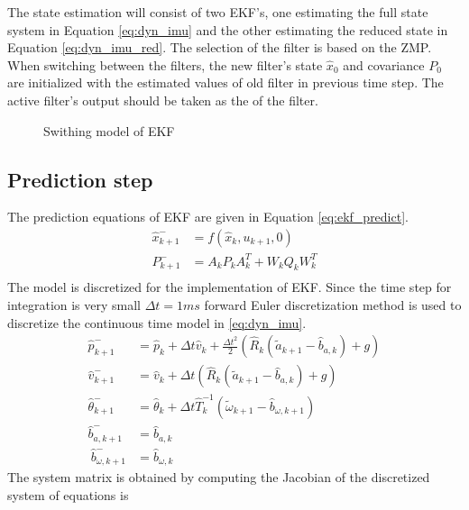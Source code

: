 The state estimation will consist of two EKF's, one estimating the full state system in Equation \ref{eq:dyn_imu} and the other estimating the reduced state in Equation \ref{eq:dyn_imu_red}. The selection of the filter is based on the ZMP. When switching between the filters, the new filter's state $\hat{x}_0$ and covariance $P_0$ are initialized with the estimated values of old filter in previous time step. The active filter's output should be taken as the of the filter.

\begin{figure}
	\centering
	
	\caption{Swithing model of EKF}
	\label{fig:ekf_switch}
\end{figure}

\subsection{Prediction step}
The prediction equations of EKF are given in Equation \ref{eq:ekf_predict}. 
\begin{equation}
\label{eq:imu_predict}
\begin{split}
\hat{x}_{k+1}^- &= f(\hat{x}_{k},u_{k+1},0)\\
P_{k+1}^- &= A_kP_{k}A_k^T + W_kQ_{k}W_k^T\\
\end{split}
\end{equation}
The model is discretized for the implementation of EKF. Since the time step for integration is very small $\Delta t = 1ms$ forward Euler discretization method is used to discretize the continuous time model in \ref{eq:dyn_imu}.
\begin{equation}
    \label{eq:dyn_imu_disc}
    \begin{split}
    \hat{p}_{k+1}^- &= \hat{p}_k + \Delta t \hat{v}_k + \frac{\Delta t^2}{2} (\hat{R}_k (\tilde{a}_{k+1} - \hat{b}_{a,k})+g) \\
    \hat{v}_{k+1}^- &= \hat{v}_k + \Delta t (\hat{R}_k (\tilde{a}_{k+1} - \hat{b}_{a,k})+g) \\
    \hat{\theta}_{k+1}^- &= \hat{\theta}_k + \Delta t \hat{T}_k^{-1}(\tilde{\omega}_{k+1} - \hat{b}_{\omega,k+1}) \\
    \hat{b}_{a,k+1}^- &= \hat{b}_{a,k}\\\
    \hat{b}_{\omega,k+1}^- &= \hat{b}_{\omega,k}
    \end{split}
\end{equation}
The system matrix is obtained by computing the Jacobian of the discretized system of equations is
